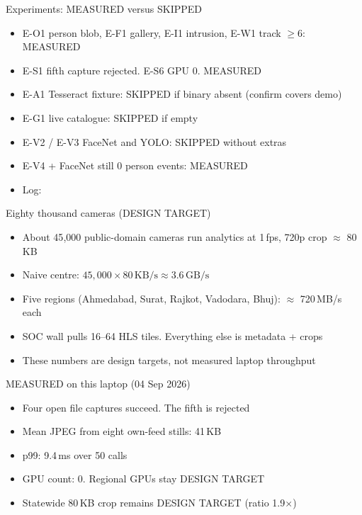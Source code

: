 \documentclass[aspectratio=169,11pt]{beamer}
\begin{document}
\begin{frame}{Experiments: MEASURED versus SKIPPED}
\begin{itemize}\itemsep0.45em
\item E-O1 person blob, E-F1 gallery, E-I1 intrusion, E-W1 track $\ge 6$: MEASURED
\item E-S1 fifth capture rejected. E-S6 GPU 0. MEASURED
\item E-A1 Tesseract fixture: SKIPPED if binary absent (confirm covers demo)
\item E-G1 live catalogue: SKIPPED if  empty
\item E-V2 / E-V3 FaceNet and YOLO: SKIPPED without extras
\item E-V4  + FaceNet still 0 person events: MEASURED
\item Log: 
\end{itemize}
\end{frame}

\begin{frame}{Eighty thousand cameras (DESIGN TARGET)}
\begin{itemize}\itemsep0.6em
\item About 45{,}000 public-domain cameras run analytics at 1\,fps, 720p crop $\approx$ 80\,KB
\item Naive centre: $45{,}000 \times 80\,\mathrm{KB/s} \approx 3.6\,\mathrm{GB/s}$
\item Five regions (Ahmedabad, Surat, Rajkot, Vadodara, Bhuj): $\approx$ 720\,MB/s each
\item SOC wall pulls 16--64 HLS tiles. Everything else is metadata + crops
\item These numbers are design targets, not measured laptop throughput
\end{itemize}
\end{frame}

\begin{frame}{MEASURED on this laptop (04 Sep 2026)}
\begin{itemize}\itemsep0.55em
\item Four open file captures succeed. The fifth is rejected
\item Mean JPEG from eight own-feed stills: 41\,KB
\item {} p99: 9.4\,ms over 50 calls
\item GPU count: 0. Regional GPUs stay DESIGN TARGET
\item Statewide 80\,KB crop remains DESIGN TARGET (ratio 1.9$\times$)
\end{itemize}
\end{frame}
\end{document}
